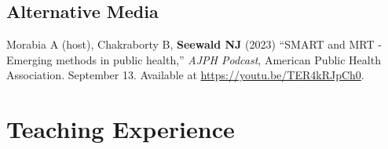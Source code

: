 \documentclass[letterpaper,11pt]{article} %
\begin{document}
	
	
	\subsection*{Alternative Media}
	
	
	\begin{etaremune}
		\item Morabia A (host), Chakraborty B, \textbf{Seewald NJ} (2023) ``SMART and MRT - Emerging methods in public health,'' \textit{AJPH Podcast}, American Public Health Association. September 13. Available at \url{https://youtu.be/TER4kRJpCh0}.
	\end{etaremune}
	
	
	\section*{Teaching Experience}
	
\end{document}
